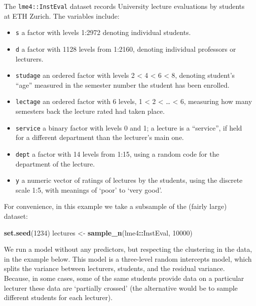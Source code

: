 \documentclass[]{article}
\newenvironment{Shaded}{\begin{snugshade}}{\end{snugshade}}
\newcommand{\KeywordTok}[1]{\textcolor[rgb]{0.13,0.29,0.53}{\textbf{#1}}}
\newcommand{\DecValTok}[1]{\textcolor[rgb]{0.00,0.00,0.81}{#1}}
\newcommand{\StringTok}[1]{\textcolor[rgb]{0.31,0.60,0.02}{#1}}
\newcommand{\OperatorTok}[1]{\textcolor[rgb]{0.81,0.36,0.00}{\textbf{#1}}}
\newcommand{\NormalTok}[1]{#1}
\theoremstyle{definition}
\theoremstyle{definition}
\theoremstyle{definition}
\theoremstyle{remark}
\begin{document}
The \texttt{lme4::InstEval} dataset records University lecture
evaluations by students at ETH Zurich. The variables include:

\begin{itemize}
\item
  \texttt{s} a factor with levels 1:2972 denoting individual students.
\item
  \texttt{d} a factor with 1128 levels from 1:2160, denoting individual
  professors or lecturers.
\item
  \texttt{studage} an ordered factor with levels 2 \textless{} 4
  \textless{} 6 \textless{} 8, denoting student's ``age'' measured in
  the semester number the student has been enrolled.
\item
  \texttt{lectage} an ordered factor with 6 levels, 1 \textless{} 2
  \textless{} \ldots{} \textless{} 6, measuring how many semesters back
  the lecture rated had taken place.
\item
  \texttt{service} a binary factor with levels 0 and 1; a lecture is a
  ``service'', if held for a different department than the lecturer's
  main one.
\item
  \texttt{dept} a factor with 14 levels from 1:15, using a random code
  for the department of the lecture.
\item
  \texttt{y} a numeric vector of ratings of lectures by the students,
  using the discrete scale 1:5, with meanings of `poor' to `very good'.
\end{itemize}

For convenience, in this example we take a subsample of the (fairly
large) dataset:

\begin{Shaded}
\begin{Highlighting}[]
\KeywordTok{set.seed}\NormalTok{(}\DecValTok{1234}\NormalTok{)}
\NormalTok{lectures <-}\StringTok{ }\KeywordTok{sample_n}\NormalTok{(lme4}\OperatorTok{::}\NormalTok{InstEval, }\DecValTok{10000}\NormalTok{)}
\end{Highlighting}
\end{Shaded}

We run a model without any predictors, but respecting the clustering in
the data, in the example below. This model is a three-level random
intercepts model, which splits the variance between lecturers, students,
and the residual variance. Because, in some cases, some of the same
students provide data on a particular lecturer these data are `partially
crossed' (the alternative would be to sample different students for each
lecturer).
\end{document}
